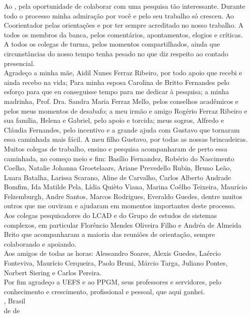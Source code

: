 
\begin{agradecimentos}
Ao \theadvisor, pela oportunidade de colaborar com uma pesquisa tão interessante. Durante todo o processo minha admiração por você e pelo seu trabalho só cresceu. Ao Coorientador \thecoadvisor pelas orientações e por ter sempre acreditado no nosso trabalho. A todos os membros da banca, pelos comentários, apontamentos, elogios e críticas. A todos os colegas de turma, pelos momentos compartilhados, ainda que circunstâncias do nosso tempo tenha pesado no que diz respeito ao contado presencial.
\\
Agradeço a minha mãe, Aidil Nunes Ferraz Ribeiro, por todo apoio que recebi e ainda recebo na vida; Para minha esposa Carolina de Britto Fernandes pelo esforço para que eu conseguisse tempo para me dedicar à pesquisa; a minha madrinha, Prof. Dra. Sandra Maria Ferraz Mello, pelos conselhos acadêmicos e pelos meus momentos de desabafo; a meu irmão e amigo Rogério Ferraz Ribeiro e sua família, Helena e Gabriel, pelo apoio e torcida; meus sogros, Alfredo e Cláudia Fernandes, pelo incentivo e a grande ajuda com Gustavo que tornaram essa caminhada mais fácil. A meu filho Gustavo, por todas as nossas brincadeiras.
\\
Muitos colegas de trabalho, ensino e pesquisa acompanharam de perto essa caminhada, no começo meio e fim: Basílio Fernandez, Robério do Nascimento Coelho, Natalie Johanna Groetelaars, Ariane Prevedello Rubin, Bruno Leão, Luara Batalha, Larissa Scarano, Aline de Carvalho, Carlos Alberto Andrade Bomfim, Ida Matilde Pela, Lídia Quièto Viana, Marina Coêlho Teixeira, Maurício Felzemburgh, Andre Santos, Marcos Rodrigues, Everaldo Guedes, dentre muitos outros que me ouviram e ajudaram em momentos importantes deste processo. Aos colegas pesquisadores do LCAD e do Grupo de estudos de sistemas complexos, em particular Florêncio Mendes Oliveira Filho e Andréa de Almeida Brito que acompanharam a maioria das reuniões de orientação, sempre colaborando e apoiando.
\\
Aos amigos de todas as horas: Alessandro Soares, Alexis Guedes, Laércio Fonteviva, Maurício Cerqueira, Paolo Bruni, Márcio Targa, Juliano Pontes, Norbert Siering e Carlos Pereira.
\\
Por fim agradeço a UEFS e ao PPGM, seus professores e servidores, pelo conhecimento e crescimento, profissional e pessoal, que aqui ganhei.
\\

\noindent
\ppgmcidade, Brasil \hfill \theauthor\\
\ppgmdia\space de \ppgmmes\space de \ppgmano
\end{agradecimentos}
